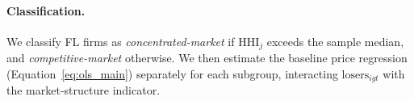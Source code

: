 \paragraph{Classification.}
We classify FL firms as \emph{concentrated-market} if
$\text{HHI}_j$ exceeds the sample median, and
\emph{competitive-market} otherwise. We then estimate the baseline
price regression (Equation~\ref{eq:ols_main}) separately for each
subgroup, interacting $\text{losers}_{igt}$ with the
market-structure indicator.

